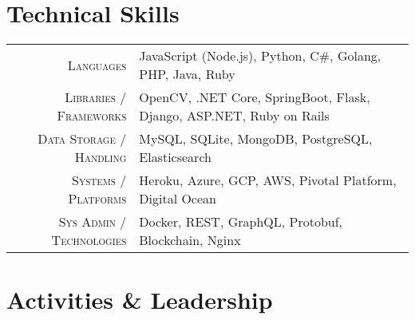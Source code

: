 \documentclass[a4paper,10pt]{extarticle} %
\begin{document}
\section{\textcolor{primary}{Technical Skills}}

\begin{tabular}{r|p{15cm}}
\textsc{Languages} & JavaScript (Node.js), Python, C#, Golang, PHP, Java, Ruby \\
\textsc{Libraries / Frameworks} & OpenCV, .NET Core, SpringBoot, Flask, Django, ASP.NET, Ruby on Rails \\
\textsc{Data Storage / Handling} & MySQL, SQLite, MongoDB, PostgreSQL, Elasticsearch \\
\textsc{Systems / Platforms} & Heroku, Azure, GCP, AWS, Pivotal Platform, Digital Ocean \\
\textsc{Sys Admin / Technologies} & Docker, REST, GraphQL, Protobuf, Blockchain, Nginx\\
\end{tabular}


\vspace{-0.2cm}
\section{\textcolor{primary}{Activities \& Leadership}}
\end{document}

